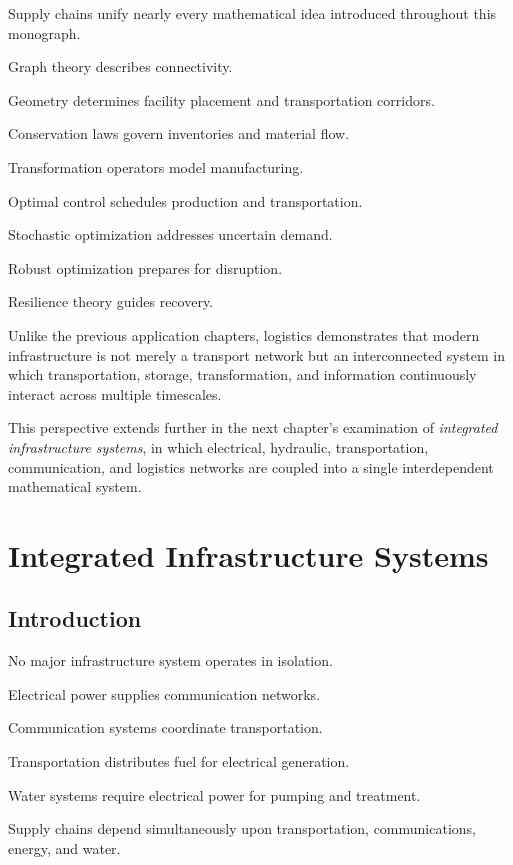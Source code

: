 \documentclass[11pt,fleqn]{book}
\numberwithin{equation}{chapter}
\theoremstyle{plain}
\theoremstyle{definition}
\theoremstyle{remark}
\begin{document}
Supply chains unify nearly every mathematical idea introduced throughout
this monograph.

Graph theory describes connectivity.

Geometry determines facility placement and transportation corridors.

Conservation laws govern inventories and material flow.

Transformation operators model manufacturing.

Optimal control schedules production and transportation.

Stochastic optimization addresses uncertain demand.

Robust optimization prepares for disruption.

Resilience theory guides recovery.

Unlike the previous application chapters, logistics demonstrates that
modern infrastructure is not merely a transport network but an
interconnected system in which transportation, storage,
transformation, and information continuously interact across multiple
timescales.

This perspective extends further in the next chapter's examination of
\emph{integrated infrastructure systems}, in which electrical,
hydraulic, transportation, communication, and logistics networks are
coupled into a single interdependent mathematical system.

\chapter{Integrated Infrastructure Systems}

\section{Introduction}

No major infrastructure system operates in isolation.

Electrical power supplies communication networks.

Communication systems coordinate transportation.

Transportation distributes fuel for electrical generation.

Water systems require electrical power for pumping and treatment.

Supply chains depend simultaneously upon transportation,
communications,
energy,
and water.
\end{document}
